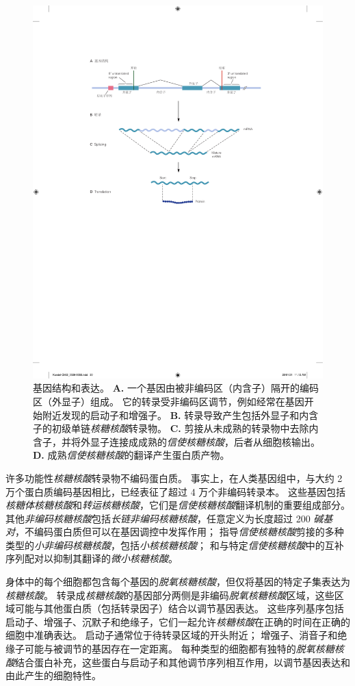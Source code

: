 \begin{figure}[htbp]
	\centering
	\includegraphics[width=0.75\linewidth]{chap02/fig_2_3}
	\caption{基因结构和表达。
		\textbf{A.} 一个基因由被非编码区（内含子）隔开的编码区（外显子）组成。
		它的转录受非编码区调节，例如经常在基因开始附近发现的启动子和增强子。
		\textbf{B.} 转录导致产生包括外显子和内含子的初级单链\textit{核糖核酸}转录物。
		\textbf{C.} 剪接从未成熟的转录物中去除内含子，并将外显子连接成成熟的\textit{信使核糖核酸}，后者从细胞核输出。
		\textbf{D.} 成熟\textit{信使核糖核酸}的翻译产生蛋白质产物。}
	\label{fig:2_3}
\end{figure}


许多功能性\textit{核糖核酸}转录物不编码蛋白质。 
事实上，在人类基因组中，与大约 2 万个蛋白质编码基因相比，已经表征了超过 4 万个非编码转录本。
这些基因包括\textit{核糖体核糖核酸}和\textit{转运核糖核酸}，它们是\textit{信使核糖核酸}翻译机制的重要组成部分。
其他\textit{非编码核糖核酸}包括\textit{长链非编码核糖核酸}，任意定义为长度超过 200 \textit{碱基对}，不编码蛋白质但可以在基因调控中发挥作用；
指导\textit{信使核糖核酸}剪接的多种类型的\textit{小非编码核糖核酸}，包括\textit{小核核糖核酸}；
和与特定\textit{信使核糖核酸}中的互补序列配对以抑制其翻译的\textit{微小核糖核酸}。


身体中的每个细胞都包含每个基因的\textit{脱氧核糖核酸}，但仅将基因的特定子集表达为\textit{核糖核酸}。
转录成\textit{核糖核酸}的基因部分两侧是非编码\textit{脱氧核糖核酸}区域，这些区域可能与其他蛋白质（包括转录因子）结合以调节基因表达。
这些序列基序包括启动子、增强子、沉默子和绝缘子，它们一起允许\textit{核糖核酸}在正确的时间在正确的细胞中准确表达。
启动子通常位于待转录区域的开头附近；
增强子、消音子和绝缘子可能与被调节的基因存在一定距离。
每种类型的细胞都有独特的\textit{脱氧核糖核酸}结合蛋白补充，这些蛋白与启动子和其他调节序列相互作用，以调节基因表达和由此产生的细胞特性。


